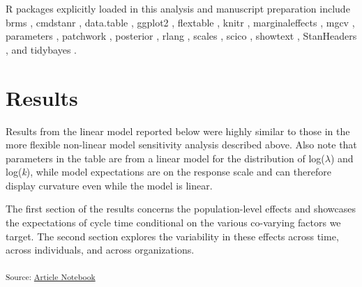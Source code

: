 \documentclass[
  sn-mathphys-ay,
]{sn-jnl}
\begin{document}
R packages explicitly loaded in this analysis and manuscript preparation
include brms
\citep[v2.22.7,][]{burknerAdvancedBayesianMultilevel2018, burknerBayesianItemResponse2021, burknerBrmsPackageBayesian2017},
cmdstanr \citep[v0.8.0,][]{gabryCmdstanrInterfaceCmdStan2024},
data.table \citep[v1.15.4,][]{barrettDatatableExtensionDataframe2024},
ggplot2 \citep[v3.5.0,][]{wickhamGgplot2ElegantGraphics2016}, flextable
\citep[v0.9.5,][]{gohelFlextableFunctionsTabular2024}, knitr
\citep[v1.46,][]{xieDynamicDocumentsKnitr2015, xieKnitrComprehensiveTool2014, xieKnitrGeneralpurposePackage2024},
marginaleffects
\citep[v0.19.0,][]{arel-bundockMarginaleffectsPredictionsComparisons2024},
mgcv
\citep[v1.9.0,][]{woodFastStableRestricted2011, woodGeneralizedAdditiveModels2017, woodSmoothingParameterModel2016, woodStableEfficientMultiple2004, woodThinplateRegressionSplines2003},
parameters \citep[v0.21.6,][]{ludeckeExtractingComputingExploring2020},
patchwork \citep[v1.2.0,][]{pedersenPatchworkComposerPlots2024},
posterior
\citep[v1.5.0,][]{burknerPosteriorToolsWorking2023, vehtariRanknormalizationFoldingLocalization2021},
rlang \citep[v1.1.3,][]{henryRlangFunctionsBase2024}, scales
\citep[v1.3.0,][]{wickhamScalesScaleFunctions2023}, scico
\citep[v1.5.0.9000,][]{pedersenScicoColourPalettes2025}, showtext
\citep[v0.9.7,][]{qiuShowtextUsingFonts2024}, StanHeaders
\citep[v2.36.0.9000,][]{standevelopmentteamStanHeadersHeadersInterface2020},
and tidybayes \citep[v3.0.6,][]{kayTidybayesTidyData2023}.

\section{Results}\label{results}

Results from the linear model reported below were highly similar to
those in the more flexible non-linear model sensitivity analysis
described above. Also note that parameters in the table are from a
linear model for the distribution of log(\(\lambda\)) and log(\emph{k}),
while model expectations are on the response scale and can therefore
display curvature even while the model is linear.

The first section of the results concerns the population-level effects
and showcases the expectations of cycle time conditional on the various
co-varying factors we target. The second section explores the
variability in these effects across time, across individuals, and across
organizations.

\textsubscript{Source:
\href{https://ps-data.github.io/uttvas-manuscript/index.qmd.html}{Article
Notebook}}
\end{document}
